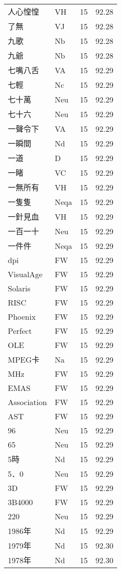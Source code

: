 \documentclass[twocolumn]{book}
\begin{document}
\begin{supertabular}{llrr}
人心惶惶 & VH & 15 &  92.28\\
了無 & VJ & 15 &  92.28\\
九歌 & Nb & 15 &  92.28\\
九爺 & Nb & 15 &  92.28\\
七嘴八舌 & VA & 15 &  92.29\\
七輕 & Nc & 15 &  92.29\\
七十萬 & Neu & 15 &  92.29\\
七十六 & Neu & 15 &  92.29\\
一聲令下 & VA & 15 &  92.29\\
一瞬間 & Nd & 15 &  92.29\\
一道 & D & 15 &  92.29\\
一睹 & VC & 15 &  92.29\\
一無所有 & VH & 15 &  92.29\\
一隻隻 & Neqa & 15 &  92.29\\
一針見血 & VH & 15 &  92.29\\
一百一十 & Neu & 15 &  92.29\\
一件件 & Neqa & 15 &  92.29\\
dpi & FW & 15 &  92.29\\
VisualAge & FW & 15 &  92.29\\
Solaris & FW & 15 &  92.29\\
RISC & FW & 15 &  92.29\\
Phoenix & FW & 15 &  92.29\\
Perfect & FW & 15 &  92.29\\
OLE & FW & 15 &  92.29\\
MPEG卡 & Na & 15 &  92.29\\
MHz & FW & 15 &  92.29\\
EMAS & FW & 15 &  92.29\\
Association & FW & 15 &  92.29\\
AST & FW & 15 &  92.29\\
96 & Neu & 15 &  92.29\\
65 & Neu & 15 &  92.29\\
5時 & Nd & 15 &  92.29\\
5．0 & Neu & 15 &  92.29\\
3D & FW & 15 &  92.29\\
3B4000 & FW & 15 &  92.29\\
220 & Neu & 15 &  92.29\\
1986年 & Nd & 15 &  92.29\\
1979年 & Nd & 15 &  92.30\\
1978年 & Nd & 15 &  92.30\\

\end{supertabular}
\end{document}
